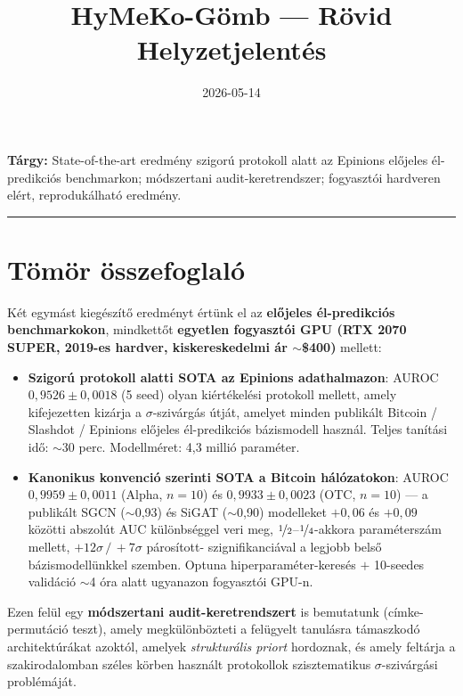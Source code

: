 \documentclass[11pt,a4paper]{article}
\title{\textbf{HyMeKo-G\"omb} — R\"ovid Helyzetjelent\'es}
\date{2026-05-14}
\author{}
\newcommand{\sig}{\ensuremath{\sigma}}
\newcommand{\pmval}[2]{\ensuremath{#1 \pm #2}}
\begin{document}
\maketitle
\thispagestyle{fancy}

\noindent\textbf{T\'argy:} State-of-the-art eredm\'eny szigor\'u
protokoll alatt az Epinions el\H{o}jeles \'el-predikci\'os benchmarkon;
m\'odszertani audit-keretrendszer; fogyaszt\'oi hardveren el\'ert,
reproduk\'alhat\'o eredm\'eny.

\hrule height 0.5pt
\vspace{0.5em}

\section*{T\"om\"or \"osszefoglal\'o}

K\'et egym\'ast kieg\'esz\'it\H{o} eredm\'enyt \'ert\"unk el az
\textbf{el\H{o}jeles \'el-predikci\'os benchmarkokon}, mindkett\H{o}t
\textbf{egyetlen fogyaszt\'oi GPU (RTX 2070 SUPER, 2019-es hardver,
kiskereskedelmi \'ar $\sim$\$400)} mellett:

\begin{itemize}
  \item \textbf{Szigor\'u protokoll alatti SOTA az Epinions
    adathalmazon}: AUROC \pmval{0{,}9526}{0{,}0018} (5 seed) olyan
    ki\'ert\'ekel\'esi protokoll mellett, amely kifejezetten kiz\'arja
    a \sig-sziv\'arg\'as \'utj\'at, amelyet minden publik\'alt
    Bitcoin / Slashdot / Epinions el\H{o}jeles \'el-predikci\'os
    b\'azismodell haszn\'al. Teljes tan\'it\'asi id\H{o}: $\sim$30 perc.
    Modellm\'eret: 4,3 milli\'o param\'eter.
  \item \textbf{Kanonikus konvenci\'o szerinti SOTA a Bitcoin
    h\'al\'ozatokon}: AUROC \pmval{0{,}9959}{0{,}0011} (Alpha,
    $n{=}10$) \'es \pmval{0{,}9933}{0{,}0023} (OTC, $n{=}10$) — a
    publik\'alt SGCN ($\sim$0,93) \'es SiGAT ($\sim$0,90) modelleket
    $+0{,}06$ \'es $+0{,}09$ k\"oz\"otti abszol\'ut AUC k\"ul\"onbs\'eggel
    veri meg, $\nicefrac{1}{2}$--$\nicefrac{1}{4}$-akkora
    param\'etersz\'am mellett, $+12\sig\,/\,+7\sig$ p\'aros\'itott-
    szignifikanci\'aval a legjobb bels\H{o} b\'azismodell\"unkkel
    szemben. Optuna hiperparam\'eter-keres\'es $+$ 10-seedes
    valid\'aci\'o $\sim$4 \'ora alatt ugyanazon fogyaszt\'oi GPU-n.
\end{itemize}

Ezen fel\"ul egy \textbf{m\'odszertani audit-keretrendszert} is
bemutatunk (c\'imke-permut\'aci\'o teszt), amely megk\"ul\"onb\"ozteti
a fel\"ugyelt tanul\'asra t\'amaszkod\'o architekt\'ur\'akat
azokt\'ol, amelyek \emph{struktur\'alis priort} hordoznak, \'es amely
felt\'arja a szakirodalomban sz\'eles k\"orben haszn\'alt protokollok
szisztematikus \sig-sziv\'arg\'asi probl\'em\'aj\'at.
\end{document}
